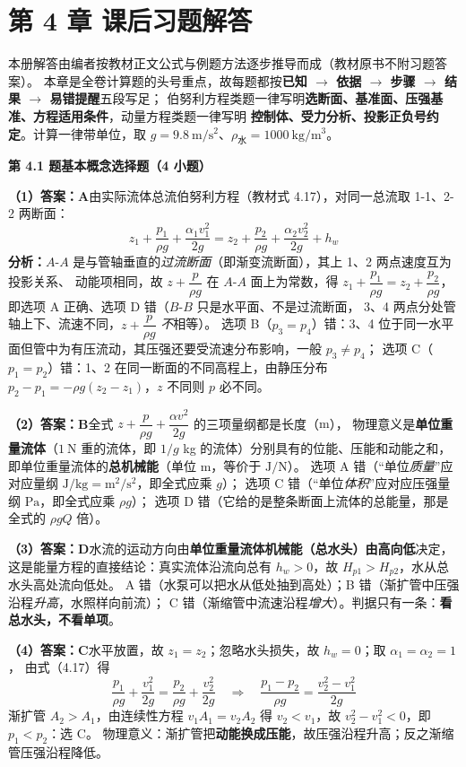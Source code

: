\chapter*{第 4 章 课后习题解答}

\begin{tishi}
本册解答由编者按教材正文公式与例题方法逐步推导而成（教材原书不附习题答案）。
本章是全卷计算题的头号重点，故每题都按\textbf{已知 $\to$ 依据 $\to$ 步骤 $\to$ 结果 $\to$ 易错提醒}五段写足；
伯努利方程类题一律写明\textbf{选断面、基准面、压强基准、方程适用条件}，动量方程类题一律写明
\textbf{控制体、受力分析、投影正负号约定}。计算一律带单位，取 $g=9.8\ \mathrm{m/s^2}$、$\rho_{\text{水}}=1000\ \mathrm{kg/m^3}$。
\end{tishi}

\noindent\textbf{第 4.1 题\quad 基本概念选择题（4 小题）}

\begin{jie}
\textbf{（1）答案：A}\quad 由实际流体总流伯努利方程（教材式 4.17），对同一总流取 1-1、2-2 两断面：
\[ z_1+\frac{p_1}{\rho g}+\frac{\alpha_1v_1^2}{2g}=z_2+\frac{p_2}{\rho g}+\frac{\alpha_2v_2^2}{2g}+h_w \]
\textbf{分析：}$A$-$A$ 是与管轴垂直的\emph{过流断面}（即渐变流断面），其上 1、2 两点速度互为投影关系、
动能项相同，故 $z+\dfrac{p}{\rho g}$ 在 $A$-$A$ 面上为常数，得
$z_1+\dfrac{p_1}{\rho g}=z_2+\dfrac{p_2}{\rho g}$，即选项 A 正确、选项 D 错（$B$-$B$ 只是水平面、不是过流断面，
3、4 两点分处管轴上下、流速不同，$z+\dfrac{p}{\rho g}$ \emph{不}相等）。
选项 B（$p_3=p_4$）错：3、4 位于同一水平面但管中为有压流动，其压强还要受流速分布影响，一般 $p_3\neq p_4$；
选项 C（$p_1=p_2$）错：1、2 在同一断面的不同高程上，由静压分布 $p_2-p_1=-\rho g(z_2-z_1)$，$z$ 不同则 $p$ 必不同。

\textbf{（2）答案：B}\quad 全式 $z+\dfrac{p}{\rho g}+\dfrac{\alpha v^2}{2g}$ 的三项量纲都是长度（$\mathrm{m}$），
物理意义是\textbf{单位重量流体}（$1\ \mathrm{N}$ 重的流体，即 $1/g$ kg 的流体）分别具有的位能、压能和动能之和，
即单位重量流体的\textbf{总机械能}（单位 $\mathrm{m}$，等价于 $\mathrm{J/N}$）。
选项 A 错（“单位\emph{质量}”应对应量纲 $\mathrm{J/kg}=\mathrm{m^2/s^2}$，即全式应乘 $g$）；
选项 C 错（“单位\emph{体积}”应对应压强量纲 $\mathrm{Pa}$，即全式应乘 $\rho g$）；
选项 D 错（它给的是整条断面上流体的总能量，那是全式的 $\rho gQ$ 倍）。

\textbf{（3）答案：D}\quad 水流的运动方向由\textbf{单位重量流体机械能（总水头）由高向低}决定，
这是能量方程的直接结论：真实流体沿流向总有 $h_w>0$，故 $H_{p1}>H_{p2}$，水从总水头高处流向低处。
A 错（水泵可以把水从低处抽到高处）；B 错（渐扩管中压强沿程\emph{升高}，水照样向前流）；
C 错（渐缩管中流速沿程\emph{增大}）。判据只有一条：\textbf{看总水头，不看单项}。

\textbf{（4）答案：C}\quad 水平放置，故 $z_1=z_2$；忽略水头损失，故 $h_w=0$；取 $\alpha_1=\alpha_2=1$，
由式（4.17）得
\[ \frac{p_1}{\rho g}+\frac{v_1^2}{2g}=\frac{p_2}{\rho g}+\frac{v_2^2}{2g}
   \quad\Longrightarrow\quad
   \frac{p_1-p_2}{\rho g}=\frac{v_2^2-v_1^2}{2g} \]
渐扩管 $A_2>A_1$，由连续性方程 $v_1A_1=v_2A_2$ 得 $v_2<v_1$，故 $v_2^2-v_1^2<0$，即 $p_1<p_2$：选 C。
物理意义：渐扩管把\textbf{动能换成压能}，故压强沿程升高；反之渐缩管压强沿程降低。
\end{jie}

